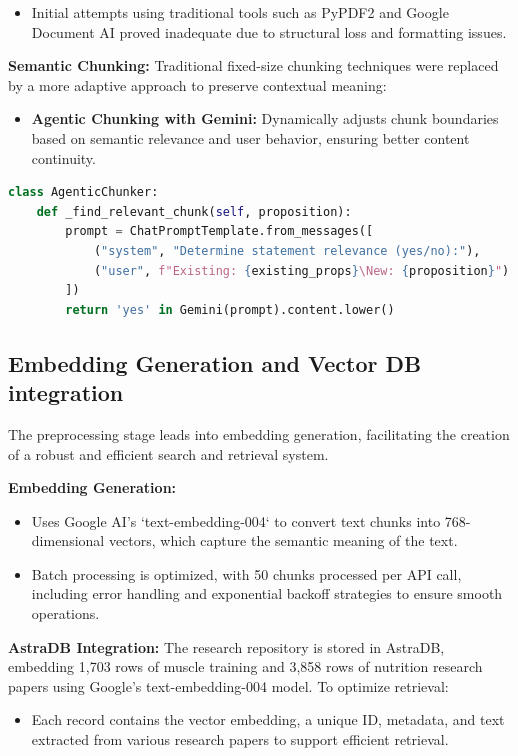 \documentclass[conference]{IEEEtran}
\begin{document}
\begin{itemize}
    \item Initial attempts using traditional tools such as PyPDF2 and Google Document AI proved inadequate due to structural loss and formatting issues.
\end{itemize}

\textbf{Semantic Chunking:}
Traditional fixed-size chunking techniques were replaced by a more adaptive approach to preserve contextual meaning:
\begin{itemize}
    \item \textbf{Agentic Chunking with Gemini:} Dynamically adjusts chunk boundaries based on semantic relevance and user behavior, ensuring better content continuity.
\end{itemize}

\begin{lstlisting}[language=Python]
class AgenticChunker:
    def _find_relevant_chunk(self, proposition):
        prompt = ChatPromptTemplate.from_messages([
            ("system", "Determine statement relevance (yes/no):"),
            ("user", f"Existing: {existing_props}\New: {proposition}")
        ])
        return 'yes' in Gemini(prompt).content.lower()
\end{lstlisting}

\subsection{Embedding Generation and Vector DB integration}
The preprocessing stage leads into embedding generation, facilitating the creation of a robust and efficient search and retrieval system.

\textbf{Embedding Generation:}
\begin{itemize}
    \item Uses Google AI's `text-embedding-004` to convert text chunks into 768-dimensional vectors, which capture the semantic meaning of the text.
    \item Batch processing is optimized, with 50 chunks processed per API call, including error handling and exponential backoff strategies to ensure smooth operations.
\end{itemize}

\textbf{AstraDB Integration:}
The research repository is stored in AstraDB, embedding 1,703 rows of muscle training and 3,858 rows of nutrition research papers using Google's text-embedding-004 model. To optimize retrieval:
\begin{itemize}
    \item Each record contains the vector embedding, a unique ID, metadata, and text extracted from various research papers to support efficient retrieval.
\end{itemize}
\end{document}
